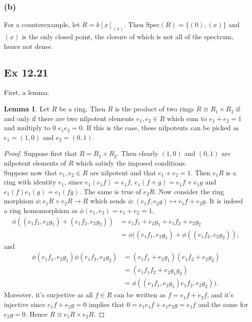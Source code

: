 \documentclass{article}
\theoremstyle{definition}
\newtheorem{lemma}[theorem]{Lemma}
\newcommand{\Spec}{\text{Spec}}
\begin{document}
\subsubsection*{(b)}

For a counterexample, let $R = k[x]_{(x)}$. Then $\Spec(R) = \{(0), (x)\}$ and
$(x)$ is the only closed point, the closure of which is not all of the
spectrum, hence not dense. 

\subsection*{Ex 12.21}
First, a lemma.

\begin{lemma}
	Let $R$ be a ring. Then $R$ is the product of two rings $R \cong R_1 \times
	R_2$ if and only if there are two nilpotent elements $e_1, e_2 \in R$ which
	sum to $e_1 + e_2 = 1$ and multiply to $0$ $e_1e_2 = 0$. If this is the
	case, these nilpotents can be picked as $e_1 = (1, 0)$ and $e_2 = (0, 1)$.
\end{lemma}
\begin{proof}
	Suppose first that $R = R_1 \times R_2$. Then clearly $(1, 0)$ and $(0, 1)$
	are nilpotent elements of $R$ which satisfy the imposed conditions. \\

	Suppose now that $e_1, e_2 \in R$ are nilpotent and that $e_1 + e_2 = 1$.
	Then $e_1R$ is a ring with identity $e_1$, since $e_1(e_1f) = e_1f$, $e_1(f
	+ g) = e_1f + e_1g$ and $e_1(f)e_1(g) = e_1(fg)$. The same is true of
	$e_2R$. Now consider the ring morphism $\phi : e_1R \times e_2R \to R$
	which sends $\phi : (e_1f, e_2g) \mapsto e_1f + e_2g$. It is indeed 
	a ring homomorphism as $\phi(e_1, e_2) = e_1 + e_2 = 1$, 
	\begin{align*}
		\phi((e_1f_1, e_2g_1) + (e_1f_2, e_2g_2))
		&=
		e_1f_1 + e_2g_1 + e_1f_2 + e_2g_2 \\
		&=
		\phi((e_1f_1, e_2g_1) + \phi((e_1f_2, e_2g_2)),
	\end{align*} 
	and
	\begin{align*}
		\phi(e_1f_1, e_2g_1)\phi(e_1f_2, e_2g_2)
		&=
		(e_1f_1 + e_2g_1)(e_1f_2 + e_2g_2) \\
		&=
		(e_1f_1f_2 + e_2g_1g_2) \\
		&=
		\phi((e_1f_1, e_2g_1)e_1f_2, e_2g_2)).
	\end{align*}
	Moreover, it's surjective as all $f \in R$ can be written as $f = e_1f +
	e_2f$, and it's injective since $e_1f + e_2g = 0$ implies that $0 = e_1e_1f
	+ e_1e_2g = e_1f$ and the same for $e_2g = 0$. Hence $R \cong e_1R \times
	e_2R$.
\end{proof}
\end{document}

